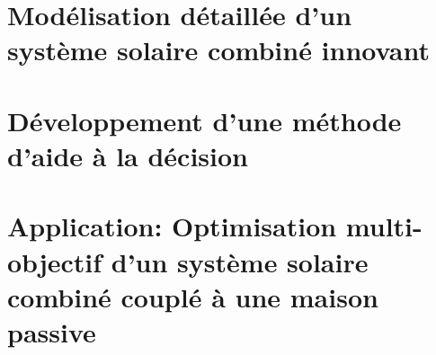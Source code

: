 \documentclass[11pt, oneside, fixOverflow]{JeremyThesis}
\begin{document}
\chapter{Modélisation détaillée d’un système solaire combiné innovant}
% 

\chapter{Développement d’une méthode d’aide à la décision}


\chapter{Application: Optimisation multi-objectif d’un système solaire combiné couplé à une maison passive}
% 

% 





% 

% 
% 
\end{document}
